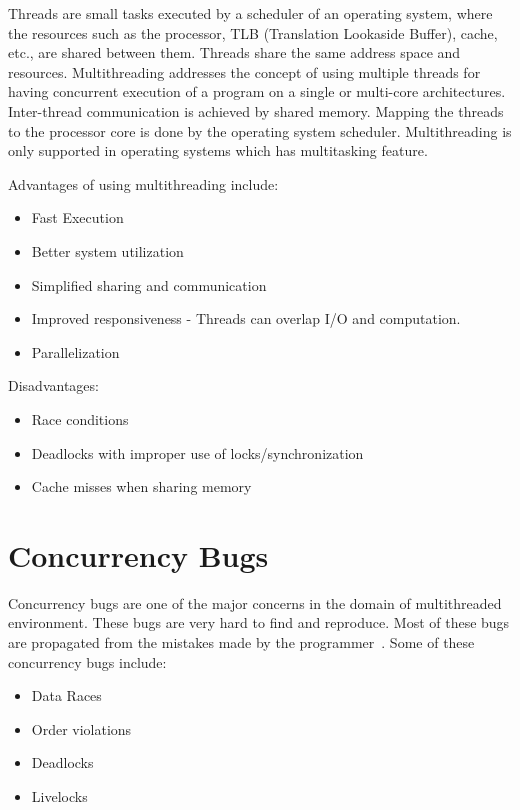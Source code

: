 Threads are small tasks executed by a scheduler of an operating system, where the resources such as the processor, TLB (Translation Lookaside Buffer), cache, etc., are shared between them. 
Threads share the same address space and resources. 
Multithreading addresses the concept of using multiple threads for having concurrent execution of a program on a single or multi-core architectures. 
Inter-thread communication is achieved by shared memory. 
Mapping the threads to the processor core is done by the operating system scheduler. 
Multithreading is only supported in operating systems which has multitasking feature. 

Advantages of using multithreading include: 
\begin{itemize}
\item	Fast Execution
\item	Better system utilization
\item	Simplified sharing  and communication
\item 	Improved responsiveness - Threads can overlap I/O and computation.
\item	Parallelization
\end{itemize}

Disadvantages:
\begin{itemize}
\item	Race conditions
\item	Deadlocks with improper use of locks/synchronization
\item	Cache misses when sharing memory
\end{itemize}

\section{Concurrency Bugs \label{con_bugs}}

Concurrency bugs are one of the major concerns in the domain of multithreaded environment. 
These bugs are very hard to find and reproduce. 
Most of these bugs are propagated from the mistakes made by the programmer~\citep{lopez2017study}. 
Some of these concurrency bugs include:
\begin{itemize}
\item	Data Races
\item 	Order violations
\item	Deadlocks
\item	Livelocks
\end{itemize}

